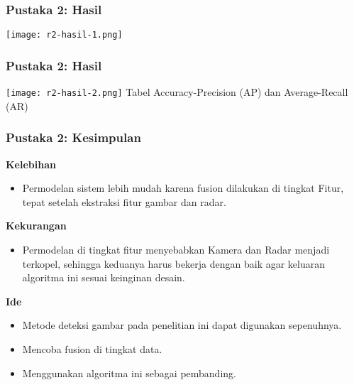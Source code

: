 \begin{frame}
    \frametitle{Pustaka 2: Hasil}
    \centering
    \texttt{[image: r2-hasil-1.png]}
\end{frame}


\begin{frame}
    \frametitle{Pustaka 2: Hasil}
    \centering
    \texttt{[image: r2-hasil-2.png]}
    Tabel Accuracy-Precision (AP) dan Average-Recall (AR)
\end{frame}


\begin{frame}
    \frametitle{Pustaka 2: Kesimpulan}

    \large
    \textbf{Kelebihan}\\
    \normalsize
    \begin{itemize}
        \item Permodelan sistem lebih mudah karena fusion dilakukan di tingkat Fitur, tepat setelah ekstraksi fitur gambar dan radar.
    \end{itemize}

    \large
    \textbf{Kekurangan}\\
    \normalsize
    \begin{itemize}
        \item Permodelan di tingkat fitur menyebabkan Kamera dan Radar menjadi terkopel, sehingga keduanya harus bekerja dengan baik agar keluaran algoritma ini sesuai keinginan desain.
    \end{itemize}

    \large
    \textbf{Ide}\\
    \normalsize
    \begin{itemize}
        \item Metode deteksi gambar pada penelitian ini dapat digunakan sepenuhnya.
        \item Mencoba fusion di tingkat data.
        \item Menggunakan algoritma ini sebagai pembanding.
    \end{itemize}

\end{frame}
